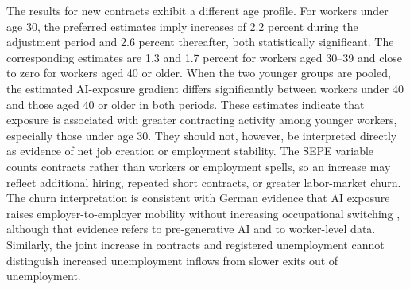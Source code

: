 \documentclass[11pt]{article}
\newcommand{\figdir}{uploads/figuresNtables}
\begin{document}



The results for new contracts exhibit a different age profile. For workers under age 30, the preferred estimates imply increases of 2.2 percent during the adjustment period and 2.6 percent thereafter, both statistically significant. The corresponding estimates are 1.3 and 1.7 percent for workers aged 30--39 and close to zero for workers aged 40 or older. When the two younger groups are pooled, the estimated AI-exposure gradient differs significantly between workers under 40 and those aged 40 or older in both periods. These estimates indicate that exposure is associated with greater contracting activity among younger workers, especially those under age 30. They should not, however, be interpreted directly as evidence of net job creation or employment stability. The SEPE variable counts contracts rather than workers or employment spells, so an increase may reflect additional hiring, repeated short contracts, or greater labor-market churn. The churn interpretation is consistent with German evidence that AI exposure raises employer-to-employer mobility without increasing occupational switching \citep{gathmann2024ai}, although that evidence refers to pre-generative AI and to worker-level data. Similarly, the joint increase in contracts and registered unemployment cannot distinguish increased unemployment inflows from slower exits out of unemployment.
\end{document}
